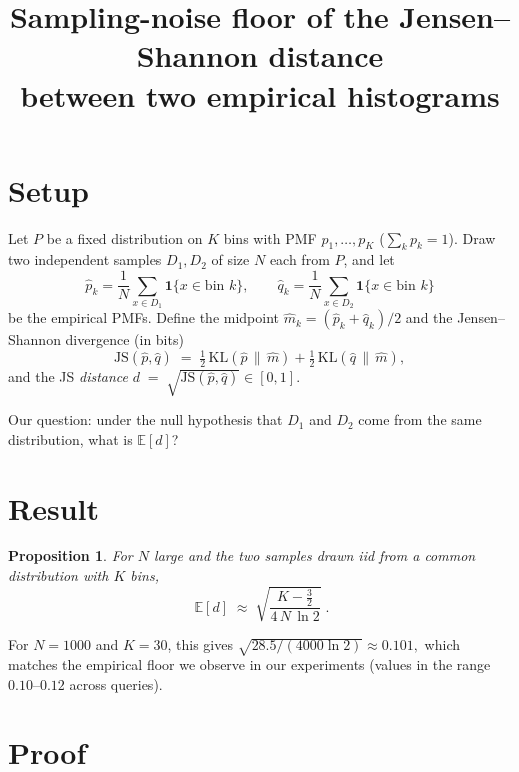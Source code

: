 \documentclass[11pt]{article}
\title{Sampling-noise floor of the Jensen--Shannon distance \\
       between two empirical histograms}
\author{}
\date{}
\newtheorem{proposition}{Proposition}
\begin{document}
\maketitle

\section{Setup}

Let $P$ be a fixed distribution on $K$ bins with PMF $p_1,\dots,p_K$
($\sum_k p_k = 1$). Draw two independent samples $D_1,D_2$ of size
$N$ each from $P$, and let
\[
  \hat p_k = \frac{1}{N}\sum_{x\in D_1}\mathbf{1}\{x\in \text{bin }k\},
  \qquad
  \hat q_k = \frac{1}{N}\sum_{x\in D_2}\mathbf{1}\{x\in \text{bin }k\}
\]
be the empirical PMFs. Define the midpoint
$\hat m_k = (\hat p_k + \hat q_k)/2$ and the
Jensen--Shannon divergence (in bits)
\[
  \mathrm{JS}(\hat p,\hat q)
  \;=\;
  \tfrac12\,\mathrm{KL}(\hat p \,\|\, \hat m)
  +\tfrac12\,\mathrm{KL}(\hat q \,\|\, \hat m),
\]
and the JS \emph{distance} $d \;=\; \sqrt{\mathrm{JS}(\hat p,\hat q)}\in[0,1]$.

Our question: under the null hypothesis that $D_1$ and $D_2$ come from the
same distribution, what is $\mathbb{E}[d]$?

\section{Result}

\begin{proposition}\label{prop:main}
For $N$ large and the two samples drawn iid from a common distribution
with $K$ bins,
\[
  \boxed{\;\mathbb{E}[d]
  \;\approx\;
  \sqrt{\dfrac{K-\tfrac32}{4\,N\,\ln 2}}\;}.
\]
\end{proposition}

For $N=1000$ and $K=30$, this gives
\(
\sqrt{28.5 / (4000\ln 2)} \approx 0.101,
\)
which matches the empirical floor we observe in our experiments
(values in the range $0.10$--$0.12$ across queries).

\section{Proof}
\end{document}
